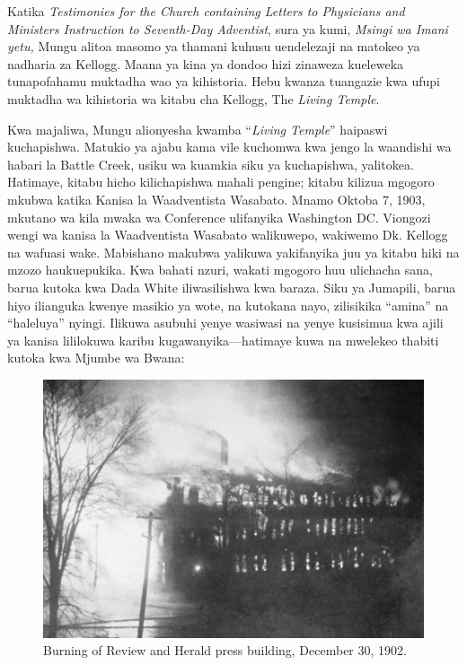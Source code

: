 
Katika \textit{Testimonies for the Church containing Letters to Physicians and Ministers Instruction to Seventh-Day Adventist}, sura ya kumi, \textit{Msingi wa Imani yetu,} Mungu alitoa masomo ya thamani kuhusu uendelezaji na matokeo ya nadharia za Kellogg. Maana ya kina ya dondoo hizi zinaweza kueleweka tunapofahamu muktadha wao ya kihistoria. Hebu kwanza tuangazie kwa ufupi muktadha wa kihistoria wa kitabu cha Kellogg, The \textit{Living Temple}.

Kwa majaliwa, Mungu alionyesha kwamba “\textit{Living Temple}” haipaswi kuchapishwa. Matukio ya ajabu kama vile kuchomwa kwa jengo la waandishi wa habari la Battle Creek, usiku wa kuamkia siku ya kuchapishwa, yalitokea. Hatimaye, kitabu hicho kilichapishwa mahali pengine; kitabu kilizua mgogoro mkubwa katika Kanisa la Waadventista Wasabato. Mnamo Oktoba 7, 1903, mkutano wa kila mwaka wa Conference ulifanyika Washington DC. Viongozi wengi wa kanisa la Waadventista Wasabato walikuwepo, wakiwemo Dk. Kellogg na wafuasi wake. Mabishano makubwa yalikuwa yakifanyika juu ya kitabu hiki na mzozo haukuepukika. Kwa bahati nzuri, wakati mgogoro huu ulichacha sana, barua kutoka kwa Dada White iliwasilishwa kwa baraza. Siku ya Jumapili, barua hiyo ilianguka kwenye masikio ya wote, na kutokana nayo, zilisikika “amina” na “haleluya” nyingi. Ilikuwa asubuhi yenye wasiwasi na yenye kusisimua kwa ajili ya kanisa lililokuwa karibu kugawanyika—hatimaye kuwa na mwelekeo thabiti kutoka kwa Mjumbe wa Bwana:

\begin{figure}[h]
    \centering
    \includegraphics[width=1\linewidth]{images/review-and-herlad.jpg}
    \caption*{Burning of Review and Herald press building, December 30, 1902.}
    \label{fig:review-and-herald}
\end{figure}

